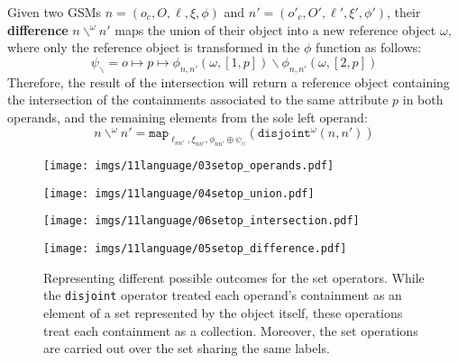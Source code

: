 \begin{definition}[Difference]
	Given two GSMs  $n=(o_c,O,\ell,\xi,\phi)$ and $n'=(o'_c,O',\ell',\xi',\phi')$, their \textbf{difference} $n\backslash^\omega n'$ maps the union of their object into a new reference object $\omega$, where only the reference object is transformed in the $\phi$ function as follows:
	\[\psi_\backslash=o\mapsto p\mapsto \phi_{n,n'}(\omega, [1,p])\backslash\phi_{n,n'}(\omega, [2,p])\]
	Therefore, the result of the intersection will return a reference object containing the intersection of the containments associated to the same attribute $p$ in both operands, and the remaining elements from the sole left operand:
	\[n\backslash^\omega n'=\texttt{map}_{\ell_{nn'},\xi_{nn'},\phi_{nn'}\oplus \psi_\cap}(\texttt{disjoint}^\omega(n,n'))\]
\end{definition}

\begin{figure}[!t]
	\centering
	\begin{minipage}[t]{0.9\textwidth}
		\centering
		\texttt{[image: imgs/11language/03setop\_operands.pdf]}
		\label{fig:setoperands}
	\end{minipage}
	\begin{minipage}[t]{0.3\textwidth}
		\centering
		\texttt{[image: imgs/11language/04setop\_union.pdf]}
		\label{fig:setunion}
	\end{minipage}\begin{minipage}[t]{0.3\textwidth}
	\centering
	\texttt{[image: imgs/11language/06setop\_intersection.pdf]}
	\label{fig:setintersection}
\end{minipage}\begin{minipage}[t]{0.1\textwidth}
	\centering
	\texttt{[image: imgs/11language/05setop\_difference.pdf]}
	\label{fig:setdifference}
\end{minipage}
	\caption{Representing different possible outcomes for the set operators. While the \texttt{disjoint} operator treated each operand's containment as an element of a set represented by the object itself, these operations treat each containment as a collection. Moreover, the set operations are carried out over the set sharing the same labels.}
	\label{fig:setoperations}
\end{figure}


